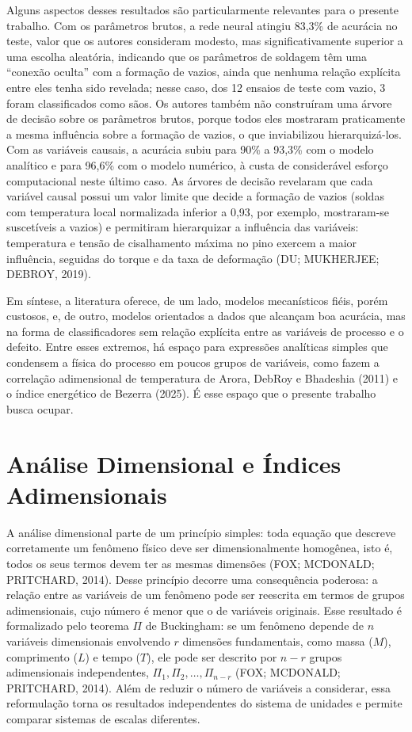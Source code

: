 \documentclass[12pt,openany]{report}
\begin{document}
Alguns aspectos desses resultados são particularmente relevantes para o presente trabalho. Com os parâmetros brutos, a rede neural atingiu 83,3\% de acurácia no teste, valor que os autores consideram modesto, mas significativamente superior a uma escolha aleatória, indicando que os parâmetros de soldagem têm uma ``conexão oculta'' com a formação de vazios, ainda que nenhuma relação explícita entre eles tenha sido revelada; nesse caso, dos 12 ensaios de teste com vazio, 3 foram classificados como sãos. Os autores também não construíram uma árvore de decisão sobre os parâmetros brutos, porque todos eles mostraram praticamente a mesma influência sobre a formação de vazios, o que inviabilizou hierarquizá-los. Com as variáveis causais, a acurácia subiu para 90\% a 93,3\% com o modelo analítico e para 96,6\% com o modelo numérico, à custa de considerável esforço computacional neste último caso. As árvores de decisão revelaram que cada variável causal possui um valor limite que decide a formação de vazios (soldas com temperatura local normalizada inferior a 0,93, por exemplo, mostraram-se suscetíveis a vazios) e permitiram hierarquizar a influência das variáveis: temperatura e tensão de cisalhamento máxima no pino exercem a maior influência, seguidas do torque e da taxa de deformação (DU; MUKHERJEE; DEBROY, 2019).

Em síntese, a literatura oferece, de um lado, modelos mecanísticos fiéis, porém custosos, e, de outro, modelos orientados a dados que alcançam boa acurácia, mas na forma de classificadores sem relação explícita entre as variáveis de processo e o defeito. Entre esses extremos, há espaço para expressões analíticas simples que condensem a física do processo em poucos grupos de variáveis, como fazem a correlação adimensional de temperatura de Arora, DebRoy e Bhadeshia (2011) e o índice energético de Bezerra (2025). É esse espaço que o presente trabalho busca ocupar.

\section{Análise Dimensional e Índices Adimensionais}
\label{sec:analise_dimensional}

A análise dimensional parte de um princípio simples: toda equação que descreve corretamente um fenômeno físico deve ser dimensionalmente homogênea, isto é, todos os seus termos devem ter as mesmas dimensões (FOX; MCDONALD; PRITCHARD, 2014). Desse princípio decorre uma consequência poderosa: a relação entre as variáveis de um fenômeno pode ser reescrita em termos de grupos adimensionais, cujo número é menor que o de variáveis originais. Esse resultado é formalizado pelo teorema $\Pi$ de Buckingham: se um fenômeno depende de $n$ variáveis dimensionais envolvendo $r$ dimensões fundamentais, como massa ($M$), comprimento ($L$) e tempo ($T$), ele pode ser descrito por $n - r$ grupos adimensionais independentes, $\Pi_1, \Pi_2, \ldots, \Pi_{n-r}$ (FOX; MCDONALD; PRITCHARD, 2014). Além de reduzir o número de variáveis a considerar, essa reformulação torna os resultados independentes do sistema de unidades e permite comparar sistemas de escalas diferentes.
\end{document}
